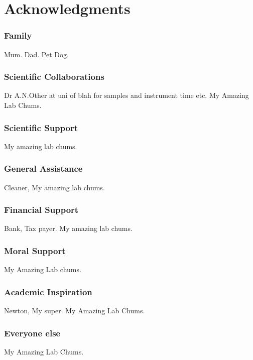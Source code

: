 \chapter*{Acknowledgments}
\subsection*{Family}
Mum. Dad. Pet Dog.

\subsection*{Scientific Collaborations}
Dr A.N.Other at uni of blah for samples and instrument time etc. My Amazing Lab Chums.

\subsection*{Scientific Support}
My amazing lab chums.

\subsection*{General Assistance}
Cleaner, My amazing lab chums.

\subsection*{Financial Support}
Bank, Tax payer. My amazing lab chums.

\subsection*{Moral Support}
My Amazing Lab chums.

\subsection*{Academic Inspiration}
Newton, My super. My Amazing Lab Chums.

\subsection*{Everyone else}
My Amazing Lab Chums.
